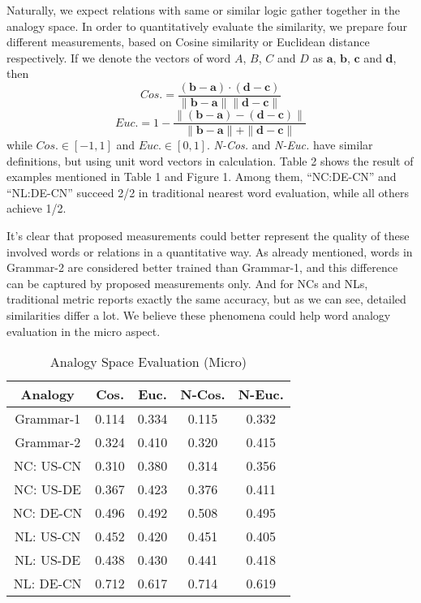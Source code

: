 \documentclass[11pt,letterpaper]{article}
\begin{document}
Naturally, we expect relations with same or similar logic gather together in the analogy space. In order to quantitatively evaluate the similarity, we prepare four different measurements, based on Cosine similarity or Euclidean distance respectively. If we denote the vectors of word $A$, $B$, $C$ and $D$ as $\mathbf{a}$, $\mathbf{b}$, $\mathbf{c}$ and $\mathbf{d}$, then
\begin{equation}
Cos. = \mathbf{\frac{(b-a) \cdot (d-c)}{\| b-a\| \|d-c\|}}
\end{equation}
\begin{equation}
Euc. = 1 - \mathbf{\frac{\| (b-a) - (d-c) \|}{\| b-a \| + \| d-c \|}}
\end{equation}
while $Cos. \in [-1, 1]$ and $Euc. \in [0, 1]$. \textit{N-Cos.} and \textit{N-Euc.} have similar definitions, but using unit word vectors in calculation. Table 2 shows the result of examples mentioned in Table 1 and Figure 1. Among them, ``NC:DE-CN'' and ``NL:DE-CN'' succeed 2/2 in traditional nearest word evaluation, while all others achieve 1/2.

It's clear that proposed measurements could better represent the quality of these involved words or relations in a quantitative way. As already mentioned, words in Grammar-2 are considered better trained than Grammar-1, and this difference can be captured by proposed measurements only. And for NCs and NLs, traditional metric reports exactly the same accuracy, but as we can see, detailed similarities differ a lot. We believe these phenomena could help word analogy evaluation in the micro aspect.


\begin{table}
\centering
\caption{Analogy Space Evaluation (Micro)}
\begin{tabular}{c | c | c | c | c}
\hline
Analogy & Cos. & Euc. & N-Cos. & N-Euc.\\
\hline
Grammar-1 & 0.114 & 0.334 & 0.115 & 0.332\\
Grammar-2 & 0.324 & 0.410 & 0.320 & 0.415\\
\hline
NC: US-CN & 0.310 & 0.380 & 0.314 & 0.356\\
NC: US-DE & 0.367 & 0.423 & 0.376 & 0.411\\
NC: DE-CN & 0.496 & 0.492 & 0.508 & 0.495\\
\hline
NL: US-CN & 0.452 & 0.420 & 0.451 & 0.405\\
NL: US-DE & 0.438 & 0.430 & 0.441 & 0.418\\
NL: DE-CN & 0.712 & 0.617 & 0.714 & 0.619\\
\hline
\end{tabular}
\end{table}
\end{document}
